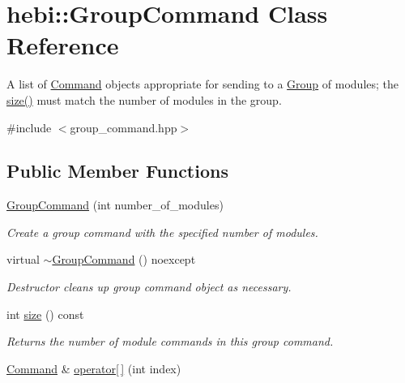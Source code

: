 \hypertarget{classhebi_1_1GroupCommand}{}\section{hebi\+:\+:Group\+Command Class Reference}
\label{classhebi_1_1GroupCommand}


A list of \hyperlink{classhebi_1_1Command}{Command} objects appropriate for sending to a \hyperlink{classhebi_1_1Group}{Group} of modules; the \hyperlink{classhebi_1_1GroupCommand_a75645b28175dde77de35801909d58213}{size()} must match the number of modules in the group.  




{\ttfamily \#include $<$group\+\_\+command.\+hpp$>$}

\subsection*{Public Member Functions}
\begin{DoxyCompactItemize}
\item 
\hyperlink{classhebi_1_1GroupCommand_a7a41c0aace3d99b0d7e9dcd9b1063a11}{Group\+Command} (int number\+\_\+of\+\_\+modules)\hypertarget{classhebi_1_1GroupCommand_a7a41c0aace3d99b0d7e9dcd9b1063a11}{}\label{classhebi_1_1GroupCommand_a7a41c0aace3d99b0d7e9dcd9b1063a11}

\begin{DoxyCompactList}\small\item\em Create a group command with the specified number of modules. \end{DoxyCompactList}\item 
virtual \hyperlink{classhebi_1_1GroupCommand_a382b2ce9d36ab4892a5191407001455c}{$\sim$\+Group\+Command} () noexcept\hypertarget{classhebi_1_1GroupCommand_a382b2ce9d36ab4892a5191407001455c}{}\label{classhebi_1_1GroupCommand_a382b2ce9d36ab4892a5191407001455c}

\begin{DoxyCompactList}\small\item\em Destructor cleans up group command object as necessary. \end{DoxyCompactList}\item 
int \hyperlink{classhebi_1_1GroupCommand_a75645b28175dde77de35801909d58213}{size} () const \hypertarget{classhebi_1_1GroupCommand_a75645b28175dde77de35801909d58213}{}\label{classhebi_1_1GroupCommand_a75645b28175dde77de35801909d58213}

\begin{DoxyCompactList}\small\item\em Returns the number of module commands in this group command. \end{DoxyCompactList}\item 
\hyperlink{classhebi_1_1Command}{Command} \& \hyperlink{classhebi_1_1GroupCommand_afa9edb2ec0c411b4d9ca701350339a90}{operator\mbox{[}$\,$\mbox{]}} (int index)
\end{DoxyCompactItemize}
